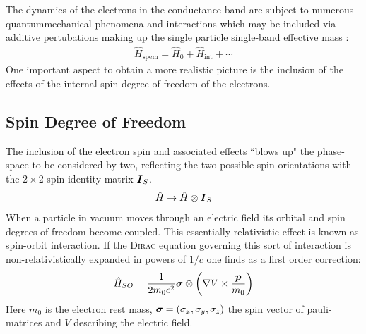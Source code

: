 The dynamics of the electrons in the conductance band are subject to numerous quantummechanical phenomena and interactions which may be included via additive pertubations making up the single particle single-band effective mass \hamil{}:
\begin{align}
\hat{H}_{\text{spem}} = \hat{H}_0 + \hat{H}_{\text{int}}+\dotsb \label{eqn:generalhamil}
\end{align}
One important aspect to obtain a more realistic picture is the inclusion of the effects of the internal spin degree of freedom of the electrons.
\subsection{Spin Degree of Freedom}
The inclusion of the electron spin and associated effects ``blows up" the phase-space to be considered by two, reflecting the two possible spin orientations with the $2 \times 2$ spin identity matrix $\boldsymbol{I}_S$. 
\begin{align}
\hat{H} \rightarrow \hat{H} \otimes \boldsymbol{I}_S
\end{align}
When a particle in vacuum moves through an electric field its orbital and spin degrees of freedom become coupled. This essentially relativistic effect is known as spin-orbit interaction. If the \textsc{Dirac} equation governing this sort of interaction is non-relativistically expanded in powers of $1/c$ one finds as a first order correction\cite{Nowack2009Thesis}:
\begin{align}
\hat{H}_{SO} = \frac{1}{2m_0c^2} \boldsymbol{\sigma} \otimes \left( \nabla V \times \frac{\boldsymbol{p}}{m_0}\right)
\label{eqn:spinorbithamil}
\end{align}
Here $m_0$ is the electron rest mass, $\boldsymbol{\sigma} = (\sigma_x, \sigma_y,\sigma_z)$ the spin vector of pauli-matrices and $V$ describing the electric field. 
